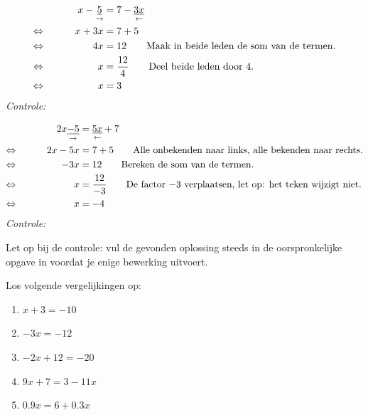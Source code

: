 \documentclass{bis}
\begin{document}
\begin{voorbeeld}
\begin{alignat*}{2}
     && x-\underset{\rightarrow}{\underline{5}}  &= 7-\underset{\leftarrow}{\underline{3x}}\\
\Leftrightarrow\mkern40mu && x + 3x &= 7 + 5 \\
\Leftrightarrow\mkern40mu && 4x &= 12 \qquad \text{Maak in beide leden de som van de termen.}\\
\Leftrightarrow\mkern40mu && x&=\dfrac{12}{4} \qquad\text{Deel beide leden door 4.}\\
\Leftrightarrow\mkern40mu && x&=3 \\
\end{alignat*}
{\em Controle: }\\
\end{voorbeeld}

\begin{voorbeeld}
\begin{alignat*}{2}
     && 2x\underset{\rightarrow}{\underline{-5}}  &= \underset{\leftarrow}{\underline{5x}}+7\\
\Leftrightarrow\mkern40mu && 2x-5x &= 7+5 \qquad\text{Alle onbekenden naar links, alle bekenden naar rechts.} \\
\Leftrightarrow\mkern40mu && -3x   &= 12 \qquad \text{Bereken de som van de termen.}\\
\Leftrightarrow\mkern40mu && x     &=\dfrac{12}{-3} \qquad\text{De factor $-3$ verplaatsen, let op: het teken wijzigt niet.}\\
\Leftrightarrow\mkern40mu && x     &= -4 \\
\end{alignat*}
{\em Controle: }\\
\end{voorbeeld}

Let op bij de controle: vul de gevonden oplossing steeds in de oorspronkelijke opgave in voordat je enige bewerking uitvoert.

\begin{exercise}
Los volgende vergelijkingen op:
\begin{enumerate}
  \item $x+3=-10$
  \item $-3x=-12$
  \item $- 2x + 12 = - 20$
  \item $9x + 7 = 3 - 11x$
  \item $0.9x = 6 + 0.3x$
\end{enumerate}
\end{exercise}
\end{document}
